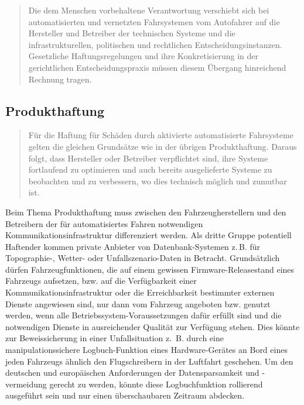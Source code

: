 \documentclass[twoside,a4paper,12pt]{article}
\begin{document}
\begin{quote}
\glqq
Die dem Menschen vorbehaltene Verantwortung verschiebt sich bei automatisierten und
vernetzten Fahrsystemen vom Autofahrer auf die Hersteller und Betreiber der technischen Systeme und die infrastrukturellen, 
politischen und rechtlichen Entscheidungsinstanzen. Gesetzliche Haftungsregelungen und ihre Konkretisierung in der gerichtlichen
Entscheidungspraxis müssen diesem Übergang hinreichend Rechnung tragen.\grqq\mbox{~\cite[S. 11]{ek}}
\end{quote}

\subsection{Produkthaftung} \label{Produkthaftung}

\begin{quote}
\glqq
Für die Haftung für Schäden durch aktivierte automatisierte Fahrsysteme gelten die gleichen Grundsätze wie in der übrigen 
Produkthaftung. Daraus folgt, dass Hersteller oder
Betreiber verpflichtet sind, ihre Systeme fortlaufend zu optimieren und auch bereits ausgelieferte Systeme zu beobachten und zu 
verbessern, wo dies technisch möglich und zumutbar ist.\grqq\mbox{~\cite[S. 12]{ek}}
\end{quote}

Beim Thema Produkthaftung muss zwischen den Fahrzeugherstellern und den Betreibern der für automatisiertes Fahren notwendigen
Kommunikationsinfrastruktur differenziert werden. Als dritte Gruppe potentiell Haftender kommen private Anbieter von Datenbank-Systemen z.\,B. für 
Topographie-, Wetter- oder Unfallszenario-Daten in Betracht. Grundsätzlich dürfen Fahrzeugfunktionen, die auf einem gewissen Firmware-Releasestand
eines Fahrzeugs aufsetzen, bzw. auf die Verfügbarkeit einer Kommunikationsinfrastruktur oder die Erreichbarkeit bestimmter externen Dienste
angewiesen sind, nur dann vom Fahrzeug angeboten bzw. genutzt werden, wenn alle \glqq Betriebssystem\grqq -Voraussetzungen dafür erfüllt sind 
und die notwendigen Dienste in ausreichender Qualität zur Verfügung stehen. Dies könnte zur Beweissicherung in einer Unfallsituation
z.\, B. durch eine manipulationssichere Logbuch-Funktion eines Hardware-Gerätes an Bord eines jeden Fahrzeugs ähnlich den Flugschreibern in der Luftfahrt
geschehen. Um den deutschen und europäischen Anforderungen der Datensparsamkeit und -vermeidung gerecht zu werden, könnte diese 
Logbuchfunktion rollierend ausgeführt sein und nur einen überschaubaren Zeitraum abdecken.
\end{document}
